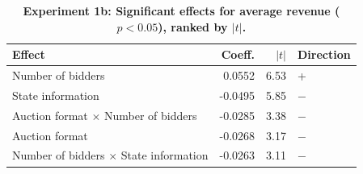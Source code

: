 \begin{table}[H]
\centering
\caption[Experiment 1b: Significant effects for average revenue ($p < 0.05$), ranked by $|t|$]{\textbf{Experiment 1b: Significant effects for average revenue ($p < 0.05$), ranked by $|t|$.}}
\label{tab:exp1b_ranked_rev}
\begin{tabular}{lrrl}
\toprule
\textbf{Effect} & \textbf{Coeff.} & \textbf{$|t|$} & \textbf{Direction} \\
\midrule
Number of bidders & 0.0552 & 6.53 & + \\
State information & -0.0495 & 5.85 & $-$ \\
Auction format $\times$ Number of bidders & -0.0285 & 3.38 & $-$ \\
Auction format & -0.0268 & 3.17 & $-$ \\
Number of bidders $\times$ State information & -0.0263 & 3.11 & $-$ \\
\bottomrule
\end{tabular}
\end{table}

